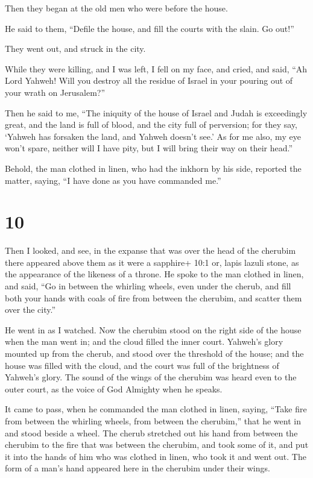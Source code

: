 Then they began at the old men who were before the house.

 He said to them, ``Defile the house, and fill the courts
with the slain. Go out!''

They went out, and struck in the city.

 While they were killing, and I was left, I fell on my face,
and cried, and said, ``Ah Lord Yahweh! Will you destroy all the residue
of Israel in your pouring out of your wrath on Jerusalem?''

 Then he said to me, ``The iniquity of the house of Israel
and Judah is exceedingly great, and the land is full of blood, and the
city full of perversion; for they say, `Yahweh has forsaken the land,
and Yahweh doesn't see.'  As for me also, my eye won't
spare, neither will I have pity, but I will bring their way on their
head.''

 Behold, the man clothed in linen, who had the inkhorn by
his side, reported the matter, saying, ``I have done as you have
commanded me.''

\hypertarget{section-8}{%
\section{10}\label{section-8}}

 Then I looked, and see, in the expanse that was over the
head of the cherubim there appeared above them as it were a sapphire+
10:1 or, lapis lazuli stone, as the appearance of the likeness of a
throne.  He spoke to the man clothed in linen, and said,
``Go in between the whirling wheels, even under the cherub, and fill
both your hands with coals of fire from between the cherubim, and
scatter them over the city.''

He went in as I watched.  Now the cherubim stood on the
right side of the house when the man went in; and the cloud filled the
inner court.  Yahweh's glory mounted up from the cherub, and
stood over the threshold of the house; and the house was filled with the
cloud, and the court was full of the brightness of Yahweh's glory.
 The sound of the wings of the cherubim was heard even to
the outer court, as the voice of God Almighty when he speaks.

 It came to pass, when he commanded the man clothed in
linen, saying, ``Take fire from between the whirling wheels, from
between the cherubim,'' that he went in and stood beside a wheel.
 The cherub stretched out his hand from between the cherubim
to the fire that was between the cherubim, and took some of it, and put
it into the hands of him who was clothed in linen, who took it and went
out.  The form of a man's hand appeared here in the cherubim
under their wings.

